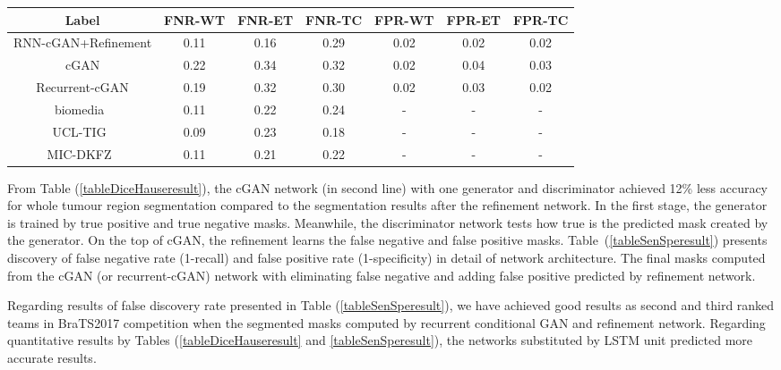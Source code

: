 \documentclass[10pt,twocolumn,letterpaper]{article}
\begin{document}
\begin{table*}[!htbp]
\begin{tabular}{*7c}
\toprule
Label    &  FNR-WT   & FNR-ET   & FNR-TC &  FPR-WT   & FPR-ET   & FPR-TC   \\
\midrule
RNN-cGAN+Refinement  &  0.11 & 0.16  & 0.29  & 0.02 & 0.02 & 0.02 \\
cGAN  &  0.22 & 0.34 & 0.32  &  0.02  &  0.04  & 0.03   \\
Recurrent-cGAN  &  0.19 & 0.32 & 0.30  &  0.02  &  0.03  & 0.02   \\
biomedia~\cite{pawlowski2018ensembles} &  0.11 & 0.22 & 0.24  & - & -  & - \\
UCL-TIG~\cite{wang2017automatic}& 0.09 & 0.23 & 0.18 & - & - & - \\
MIC-DKFZ~\cite{isensee2017brain} & 0.11 & 0.21 & 0.22 & - & - & - \\
\bottomrule
\end{tabular}
\label{tableSenSperesult}
\end{table*}

From Table (\ref{tableDiceHauseresult}), the cGAN network (in second line) with one generator and discriminator achieved 12\% less accuracy for whole tumour region segmentation compared to the segmentation results after the refinement network.
In the first stage, the generator is trained by true positive and true negative masks.
Meanwhile, the discriminator network tests how true is the predicted mask created by the generator.
On the top of cGAN, the refinement learns the false negative and false positive masks.
Table~(\ref{tableSenSperesult}) presents discovery of false negative rate (1-recall) and false positive rate (1-specificity) in detail of network architecture.
The final masks computed from the cGAN (or recurrent-cGAN) network with eliminating false negative and adding false positive predicted by refinement network.

Regarding results of false discovery rate presented in Table (\ref{tableSenSperesult}), we have achieved good results as second and third ranked teams in BraTS2017 competition when the segmented masks computed by recurrent conditional GAN and refinement network.
Regarding quantitative results by Tables (\ref{tableDiceHauseresult} and \ref{tableSenSperesult}), the networks substituted by LSTM unit predicted more accurate results.
\end{document}
